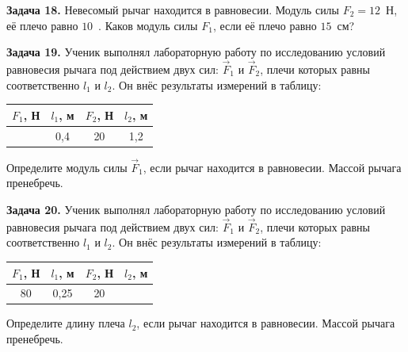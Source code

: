 \begin{taskbasic}[code={\label{task:dem26_v18_n4}}]
\textbf{Задача 18.} Невесомый рычаг находится в равновесии. Модуль силы $F_{2} = 12$~Н, её плечо равно $10$~. Каков модуль силы $F_{1}$, если её плечо равно $15$~см?

\end{taskbasic}

\begin{taskbasic}[code={\label{task:dem26_v19_n4}}]
\textbf{Задача 19.} Ученик выполнял лабораторную работу по исследованию условий равновесия рычага под действием двух сил: $\vec{F}_{1}$ и $\vec{F}_{2}$, плечи которых равны соответственно $l_{1}$ и $l_{2}$. Он внёс результаты измерений в таблицу:
\begin{center}
\begin{tabular}{|c|c|c|c|}
\hline
$F_{1}$, Н & $l_{1}$, м & $F_{2}$, Н & $l_{2}$, м \\ \hline
& 0,4 & 20 & 1,2 \\ \hline
\end{tabular}
\end{center}
Определите модуль силы $\vec{F}_{1}$, если рычаг находится в равновесии. Массой рычага пренебречь.

\end{taskbasic}

\begin{taskbasic}[code={\label{task:dem26_v20_n4}}]
\textbf{Задача 20.} Ученик выполнял лабораторную работу по исследованию условий равновесия рычага под действием двух сил: $\vec{F}_{1}$ и $\vec{F}_{2}$, плечи которых равны соответственно $l_{1}$ и $l_{2}$. Он внёс результаты измерений в таблицу:
\begin{center}
\begin{tabular}{|c|c|c|c|}
\hline
$F_{1}$, Н & $l_{1}$, м & $F_{2}$, Н & $l_{2}$, м \\ \hline
80 & 0,25 & 20 & \\ \hline
\end{tabular}
\end{center}
Определите длину плеча $l_{2}$, если рычаг находится в равновесии. Массой рычага пренебречь.

\end{taskbasic}
